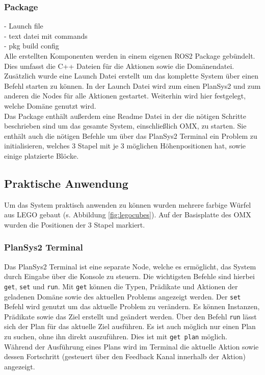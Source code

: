 \subsubsection{Package}
- Launch file\\
- text datei mit commands \\
- pkg build config\\
Alle erstellten Komponenten werden in einem eigenen \ac{ROS2} Package gebündelt. Dies umfasst die C++ Dateien für die Aktionen sowie die Domänendatei. Zusätzlich wurde eine Launch Datei erstellt um das komplette System über einen Befehl starten zu können. In der Launch Datei wird zum einen \ac{PlanSys2} und zum anderen die Nodes für alle Aktionen gestartet. Weiterhin wird hier festgelegt, welche Domäne genutzt wird.\\
Das Package enthält außerdem eine Readme Datei in der die nötigen Schritte beschrieben sind um das gesamte System, einschließlich OMX, zu starten. Sie enthält auch die nötigen Befehle um über das \ac{PlanSys2} Terminal ein Problem zu initialisieren, welches 3 Stapel mit je 3 möglichen Höhenpositionen hat, sowie einige platzierte Blöcke.


\subsection{Praktische Anwendung}
Um das System praktisch anwenden zu können wurden mehrere farbige Würfel aus LEGO gebaut (s. Abbildung \ref{fig:legocubes}). Auf der Basisplatte des OMX wurden die Positionen der 3 Stapel markiert. 
\subsubsection{PlanSys2 Terminal}
Das \ac{PlanSys2} Terminal ist eine separate Node, welche es ermöglicht, das System durch Eingabe über die Konsole zu steuern. Die wichtigsten Befehle sind hierbei \verb|get|, \verb|set| und \verb|run|. Mit \verb|get| können die Typen, Prädikate und Aktionen der geladenen Domäne sowie des aktuellen Problems angezeigt werden. Der \verb|set| Befehl wird genutzt um das aktuelle Problem zu verändern. Es können Instanzen, Prädikate sowie das Ziel erstellt und geändert werden. Über den Befehl \verb|run| lässt sich der Plan für das aktuelle Ziel ausführen. Es ist auch möglich nur einen Plan zu suchen, ohne ihn direkt auszuführen. Dies ist mit \verb|get plan| möglich.\\
Während der Ausführung eines Plans wird im Terminal die aktuelle Aktion sowie dessen Fortschritt (gesteuert über den Feedback Kanal innerhalb der Aktion) angezeigt.
